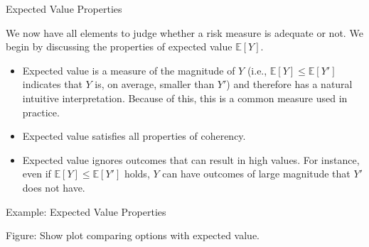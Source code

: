 \documentclass[9pt]{beamer}
\begin{document}
%
\begin{frame}{Expected Value Properties}

We now have all elements to judge whether a risk measure is adequate or not.  We begin by discussing the properties of expected value $\mathbb{E}[Y]$.

\begin{itemize}
\item Expected value is a measure of the magnitude of $Y$ (i.e., $\mathbb{E}[Y]\leq \mathbb{E}[Y']$ indicates that $Y$ is, on average, smaller than $Y'$) and therefore has a natural intuitive interpretation.  Because of this, this is a common measure used in practice. 

\item Expected value satisfies all properties of coherency. 

\item Expected value ignores outcomes that can result in high values. For instance, even if $\mathbb{E}[Y]\leq \mathbb{E}[Y']$ holds, $Y$ can have outcomes of large magnitude that $Y'$ does not have. 

\end{itemize}


\end{frame}

%
\begin{frame}{Example: Expected Value Properties}

\begin{block}{}
Figure: Show plot comparing  options with expected value. 
\end{block}

\end{frame}
\end{document}
